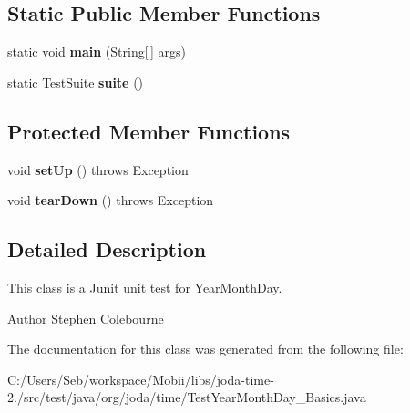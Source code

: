 \subsection*{Static Public Member Functions}
\begin{DoxyCompactItemize}
\item 
\hypertarget{classorg_1_1joda_1_1time_1_1_test_year_month_day___basics_a1726931aba7c0dfadca15dacbcdadf7f}{static void {\bfseries main} (String\mbox{[}$\,$\mbox{]} args)}\label{classorg_1_1joda_1_1time_1_1_test_year_month_day___basics_a1726931aba7c0dfadca15dacbcdadf7f}

\item 
\hypertarget{classorg_1_1joda_1_1time_1_1_test_year_month_day___basics_a96e5c74ba78996571f2250ebf1c0323c}{static Test\-Suite {\bfseries suite} ()}\label{classorg_1_1joda_1_1time_1_1_test_year_month_day___basics_a96e5c74ba78996571f2250ebf1c0323c}

\end{DoxyCompactItemize}
\subsection*{Protected Member Functions}
\begin{DoxyCompactItemize}
\item 
\hypertarget{classorg_1_1joda_1_1time_1_1_test_year_month_day___basics_abf10af583b34630df3ef024a69bf0000}{void {\bfseries set\-Up} ()  throws Exception }\label{classorg_1_1joda_1_1time_1_1_test_year_month_day___basics_abf10af583b34630df3ef024a69bf0000}

\item 
\hypertarget{classorg_1_1joda_1_1time_1_1_test_year_month_day___basics_a0f84fe1c299b09686f92e494a73b9b2f}{void {\bfseries tear\-Down} ()  throws Exception }\label{classorg_1_1joda_1_1time_1_1_test_year_month_day___basics_a0f84fe1c299b09686f92e494a73b9b2f}

\end{DoxyCompactItemize}


\subsection{Detailed Description}
This class is a Junit unit test for \hyperlink{classorg_1_1joda_1_1time_1_1_year_month_day}{Year\-Month\-Day}.

\begin{DoxyAuthor}{Author}
Stephen Colebourne 
\end{DoxyAuthor}


The documentation for this class was generated from the following file\-:\begin{DoxyCompactItemize}
\item 
C\-:/\-Users/\-Seb/workspace/\-Mobii/libs/joda-\/time-\/2./src/test/java/org/joda/time/Test\-Year\-Month\-Day\-\_\-\-Basics.\-java\end{DoxyCompactItemize}
